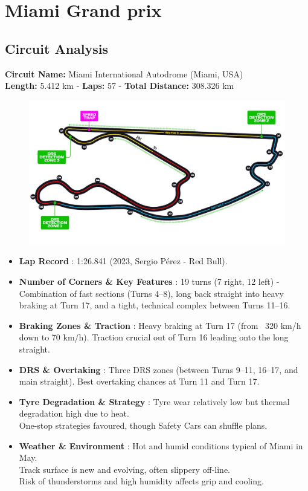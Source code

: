 \section{Miami Grand prix}

\subsection{Circuit Analysis}

\textbf{Circuit Name:} Miami International Autodrome (Miami, USA) \\
\textbf{Length:} 5.412 km - \textbf{Laps:} 57 - \textbf{Total Distance:} 308.326 km

\begin{figure}[H]
    \centering
    \includegraphics[width=0.75\linewidth]{images/6.Miami_Circuit.jpg}
\end{figure}

\begin{itemize}
    \item \textbf{Lap Record} : 1:26.841 (2023, Sergio Pérez - Red Bull).
    
    \item \textbf{Number of Corners \& Key Features} : 19 turns (7 right, 12 left) - Combination of fast sections (Turns 4–8), long back straight into heavy braking at Turn 17, and a tight, technical complex between Turns 11–16.
    
    \item \textbf{Braking Zones \& Traction} : Heavy braking at Turn 17 (from ~320 km/h down to 70 km/h). Traction crucial out of Turn 16 leading onto the long straight.
    
    \item \textbf{DRS \& Overtaking} : Three DRS zones (between Turns 9–11, 16–17, and main straight). Best overtaking chances at Turn 11 and Turn 17.
    
    \item \textbf{Tyre Degradation \& Strategy} : Tyre wear relatively low but thermal degradation high due to heat. \\
    One-stop strategies favoured, though Safety Cars can shuffle plans.
    
    \item \textbf{Weather \& Environment} : Hot and humid conditions typical of Miami in May.\\
    Track surface is new and evolving, often slippery off-line.\\
    Risk of thunderstorms and high humidity affects grip and cooling.
\end{itemize}

